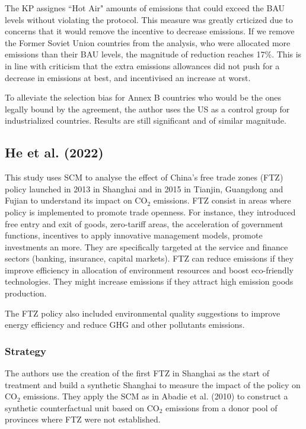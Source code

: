 \documentclass[12pt,a4paper,draft]{article}
\begin{document}
The KP assignes ``Hot Air" amounts of emissions that could exceed the BAU levels without violating 
the protocol. This measure was greatly crticized due to concerns that it would remove the incentive 
to decrease emissions. If we remove the Former Soviet Union countries from the analysis, who were 
allocated more emissions than their BAU levels, the magnitude of reduction reaches 17\%. This is in 
line with criticism that the extra emissions allowances did not push for a decrease in emissions at 
best, and incentivised an increase at worst. 

To alleviate the selection bias for Annex B countries who would be the ones legally bound by the 
agreement, the author uses the US as a control group for industrialized countries. Results are still 
significant and of similar magnitude.


\subsection{He et al. (2022)}
This study uses SCM to analyse the effect of China's free trade zones (FTZ) policy 
launched in 2013 in Shanghai and in 2015 in Tianjin, Guangdong and Fujian to 
understand its impact on CO$_2$ emissions. 
FTZ consist in areas where policy is implemented to promote trade openness. 
For instance, they introduced free entry and exit of goods, zero-tariff areas, the 
acceleration of government functions, incentives to apply innovative management models, 
promote investments an more. They are specifically targeted at the service and 
finance sectors (banking, insurance, capital markets). 
FTZ can reduce emissions if they improve efficiency in allocation 
of environment resources and boost eco-friendly technologies. They might increase 
emissions if they attract high emission goods production.

The FTZ policy also included environmental quality suggestions to improve energy 
efficiency and reduce GHG and other pollutants emissions. 

\subsubsection*{Strategy}
The authors use the creation of the first FTZ in Shanghai as the start of treatment 
and build a synthetic Shanghai to measure the impact of the policy on CO$_2$ 
emissions. They apply the SCM as in Abadie et al. (2010) to construct a synthetic 
counterfactual unit based on CO$_2$ emissions from a donor pool of provinces 
where FTZ were not established. 
\end{document}
